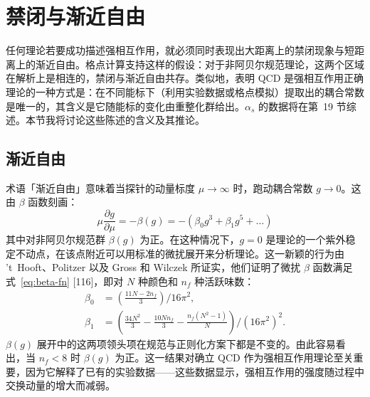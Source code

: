 
\chapter{禁闭与渐近自由}

任何理论若要成功描述强相互作用，就必须同时表现出大距离上的禁闭现象与短距离上的渐近自由。格点计算支持这样的假设：对于非阿贝尔规范理论，这两个区域在解析上是相连的，禁闭与渐近自由共存。类似地，表明 QCD 是强相互作用正确理论的一种方式是：在不同能标下（利用实验数据或格点模拟）提取出的耦合常数是唯一的，其含义是它随能标的变化由重整化群给出。$\alpha_s$ 的数据将在第~19 节综述。本节我将讨论这些陈述的含义及其推论。

\section{渐近自由}
\label{sec:asymptotic-freedom}

术语「渐近自由」意味着当探针的动量标度 $\mu \to \infty$ 时，跑动耦合常数 $g \to 0$。这由 $\beta$ 函数刻画：
\begin{equation}
  \mu\frac{\partial g}{\partial\mu}
  = -\beta(g) = -(\beta_0 g^3 + \beta_1 g^5 + \ldots)
  \label{eq:beta-fn}
\end{equation}
其中对非阿贝尔规范群 $\beta(g)$ 为正。在这种情况下，$g = 0$ 是理论的一个紫外稳定不动点，在该点附近可以用标准的微扰展开来分析理论。这一新颖的行为由 't~Hooft、Politzer 以及 Gross 和 Wilczek 所证实，他们证明了微扰 $\beta$ 函数满足式~\eqref{eq:beta-fn} [116]，即对 $N$ 种颜色和 $n_f$ 种活跃味数：
\begin{equation}
  \begin{aligned}
    \beta_0 &= \left(\frac{11N - 2n_f}{3}\right)\!/16\pi^2, \\
    \beta_1 &= \left(\frac{34N^2}{3} - \frac{10N n_f}{3}
               - \frac{n_f(N^2-1)}{N}\right)\!/(16\pi^2)^2.
  \end{aligned}
  \label{eq:beta-coeffs}
\end{equation}
$\beta(g)$ 展开中的这两项领头项在规范与正则化方案下都是不变的。由此容易看出，当 $n_f < 8$ 时 $\beta(g)$ 为正。这一结果对确立 QCD 作为强相互作用理论至关重要，因为它解释了已有的实验数据——这些数据显示，强相互作用的强度随过程中交换动量的增大而减弱。

